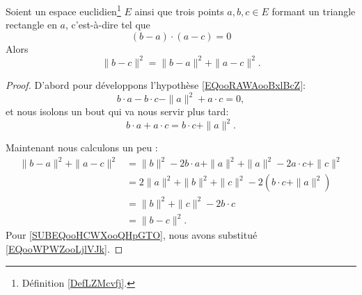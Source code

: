 \begin{theorem}     \label{THOooHXHWooCpcDan}
	Soient un espace euclidien\footnote{Définition \ref{DefLZMcvfj}.} \( E\) ainsi que trois points \( a,b,c\in E\) formant un triangle rectangle en \( a\), c'est-à-dire tel que
	\begin{equation}        \label{EQooRAWAooBxlBcZ}
		(b-a)\cdot (a-c)=0
	\end{equation}
	Alors
	\begin{equation}
		\| b-c \|^2=\| b-a \|^2+\| a-c \|^2.
	\end{equation}
\end{theorem}

\begin{proof}
	D'abord pour développons l'hypothèse \eqref{EQooRAWAooBxlBcZ}:
	\begin{equation}
		b\cdot a-b\cdot c-\| a \|^2+a\cdot c=0,
	\end{equation}
	et nous isolons un bout qui va nous servir plus tard:
	\begin{equation}        \label{EQooWPWZooLjlVJk}
		b\cdot a+a\cdot c=b\cdot c+\| a \|^2.
	\end{equation}

	Maintenant nous calculons un peu :
	\begin{subequations}
		\begin{align}
			\| b-a \|^2+\| a-c \|^2 & =\| b \|^2-2b\cdot a+\| a \|^2+\| a \|^2-2a\cdot c+\| c \|^2                           \\
			                        & =2\| a \|^2+\| b \|^2+\| c \|^2-2(b\cdot c+\| a \|^2)      \label{SUBEQooHCWXooQHpGTO} \\
			                        & =\| b \|^2+\| c \|^2-2b\cdot c                                                         \\
			                        & =\| b-c \|^2.
		\end{align}
	\end{subequations}
	Pour \eqref{SUBEQooHCWXooQHpGTO}, nous avons substitué \eqref{EQooWPWZooLjlVJk}.
\end{proof}

